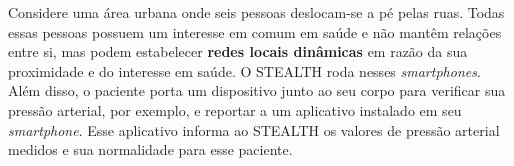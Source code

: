 \documentclass[12pt]{article}
\newcommand{\agn}[1]{\textcolor{auburn}{#1}}
\begin{document}
Considere uma área urbana onde seis pessoas deslocam-se a pé pelas ruas.
Todas essas pessoas possuem um interesse em comum em saúde e não mantêm relações entre si, mas podem estabelecer {\bf redes locais dinâmicas} em razão da sua proximidade e do interesse em saúde. %
O \mbox{STEALTH} roda nesses \textit{smartphones}. Além disso, o paciente porta um dispositivo junto ao seu corpo para verificar sua pressão arterial, por exemplo, e reportar a um aplicativo instalado em seu \textit{smartphone}. Esse aplicativo
\agn{informa ao}
\mbox{STEALTH}
os valores de pressão arterial medidos e sua normalidade para esse paciente.
\end{document}
